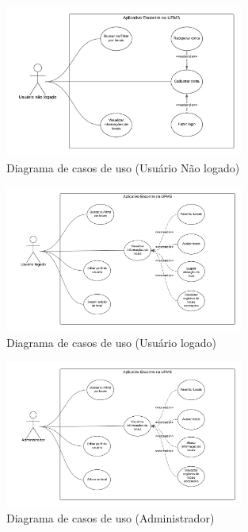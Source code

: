     

    \begin{figure}[h]
        \centering
        \includegraphics[width=0.7\textwidth]{imagens/usuarioNaoLogado.png}
        \caption{\scriptsize Diagrama de casos de uso (Usuário Não logado)}
        \label{fig:casosDeUsoUsuarioNaoLogado}
    \end{figure}

    \begin{figure}[h]
        \centering
        \includegraphics[width=0.7\textwidth]{imagens/usuarioLogado.png}
        \caption{\scriptsize Diagrama de casos de uso (Usuário logado)}
        \label{fig:casosDeUsoUsuarioLogado}
    \end{figure}

    \begin{figure}[h]
        \centering
        \includegraphics[width=0.7\textwidth]{imagens/administrador.png}
        \caption{\scriptsize Diagrama de casos de uso (Administrador)}
        \label{fig:casosDeUsoAdministrador}
    \end{figure}
    \FloatBarrier

